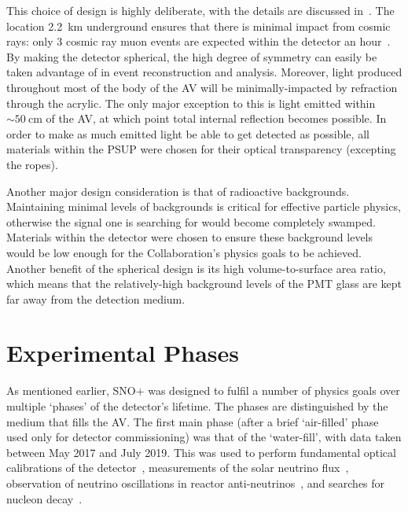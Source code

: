 This choice of design is highly deliberate, with the details are discussed in~\cite{albaneseSNOExperiment2021}. 
The location \SI{2.2}{\km} underground ensures that there is minimal impact from cosmic rays: only 3 cosmic ray muon events are expected within the detector an hour~\cite{}. %
By making the detector spherical, the high degree of symmetry can easily be taken advantage of in event reconstruction and analysis. Moreover, light produced throughout most of the body of the AV will be minimally-impacted by refraction through the acrylic. The only major exception to this is light emitted within $\sim\SI{50}{\cm}$ of the AV, at which point total internal reflection becomes possible. In order to make as much emitted light be able to get detected as possible, all materials within the PSUP were chosen for their optical transparency (excepting the ropes).

Another major design consideration is that of radioactive backgrounds. Maintaining minimal levels of backgrounds is critical for effective particle physics, otherwise the signal one is searching for would become completely swamped. Materials within the detector were chosen to ensure these background levels would be low enough for the Collaboration's physics goals to be achieved. Another benefit of the spherical design is its high volume-to-surface area ratio, which means that the relatively-high background levels of the PMT glass are kept far away from the detection medium.

\section{Experimental Phases}
As mentioned earlier, SNO+ was designed to fulfil a number of physics goals over multiple `phases' of the detector's lifetime. The phases are distinguished by the medium that fills the AV. The first main phase (after a brief `air-filled' phase used only for detector commissioning) was that of the `water-fill', with data taken between May 2017 and July 2019. This was used to perform fundamental optical calibrations of the detector~\cite{}, %
measurements of the solar neutrino flux~\cite{}, %
observation of neutrino oscillations in reactor anti-neutrinos~\cite{}, %
and searches for nucleon decay~\cite{}. %

